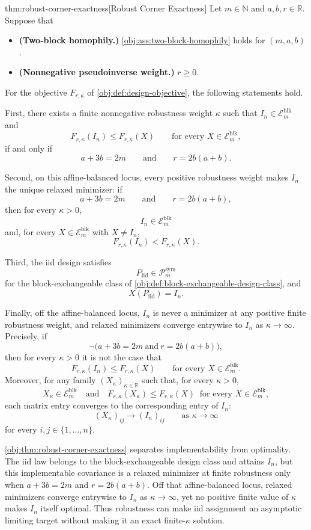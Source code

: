\documentclass[11pt]{article}
\begin{document}
\begin{theoremv}{thm:robust-corner-exactness}[Robust Corner Exactness]
Let \(m\in\mathbb N\) and \(a,b,r\in\mathbb R\). Suppose that
\begin{itemize}
\item \textbf{(Two-block homophily.)} \cref{obj:ass:two-block-homophily} holds for \((m,a,b)\).
\item \textbf{(Nonnegative pseudoinverse weight.)} \(r\ge 0\).
\end{itemize}
For the objective \(F_{r,\kappa}\) of \cref{obj:def:design-objective}, the following statements hold.

First, there exists a finite nonnegative robustness weight \(\kappa\) such that \(I_n\in\mathcal E_m^{\mathrm{blk}}\) and
\[
F_{r,\kappa}(I_n)\le F_{r,\kappa}(X)
\qquad\text{for every }X\in\mathcal E_m^{\mathrm{blk}},
\]
if and only if
\[
a+3b=2m
\qquad\text{and}\qquad
r=2b(a+b).
\]

Second, on this affine-balanced locus, every positive robustness weight makes \(I_n\) the unique relaxed minimizer: if
\[
a+3b=2m
\qquad\text{and}\qquad
r=2b(a+b),
\]
then for every \(\kappa>0\),
\[
I_n\in\mathcal E_m^{\mathrm{blk}}
\]
and, for every \(X\in\mathcal E_m^{\mathrm{blk}}\) with \(X\ne I_n\),
\[
F_{r,\kappa}(I_n)<F_{r,\kappa}(X).
\]

Third, the iid design satisfies
\[
P_{\mathrm{iid}}\in\mathcal P_m^{\mathrm{sym}}
\]
for the block-exchangeable class of \cref{obj:def:block-exchangeable-design-class}, and
\[
X(P_{\mathrm{iid}})=I_n.
\]

Finally, off the affine-balanced locus, \(I_n\) is never a minimizer at any positive finite robustness weight, and relaxed minimizers converge entrywise to \(I_n\) as \(\kappa\to\infty\). Precisely, if
\[
\neg\bigl(a+3b=2m\ \text{and}\ r=2b(a+b)\bigr),
\]
then for every \(\kappa>0\) it is not the case that
\[
F_{r,\kappa}(I_n)\le F_{r,\kappa}(X)
\qquad\text{for every }X\in\mathcal E_m^{\mathrm{blk}}.
\]
Moreover, for any family \((X_\kappa)_{\kappa\in\mathbb R}\) such that, for every \(\kappa>0\),
\[
X_\kappa\in\mathcal E_m^{\mathrm{blk}}
\quad\text{and}\quad
F_{r,\kappa}(X_\kappa)\le F_{r,\kappa}(X)
\ \text{ for every }X\in\mathcal E_m^{\mathrm{blk}},
\]
each matrix entry converges to the corresponding entry of \(I_n\):
\[
(X_\kappa)_{ij}\longrightarrow (I_n)_{ij}
\qquad\text{as }\kappa\to\infty
\]
for every \(i,j\in\{1,\ldots,n\}\).
\end{theoremv}

\cref{obj:thm:robust-corner-exactness} separates implementability from optimality. The iid law  belongs to the block-exchangeable design class and attains \(I_n\), but this implementable covariance is a relaxed minimizer at finite robustness only when \(a+3b=2m\) and \(r=2b(a+b)\). Off that affine-balanced locus, relaxed minimizers converge entrywise to \(I_n\) as \(\kappa\to\infty\), yet no positive finite value of \(\kappa\) makes \(I_n\) itself optimal. Thus robustness can make iid assignment an asymptotic limiting target without making it an exact finite-\(\kappa\) solution.
\end{document}

